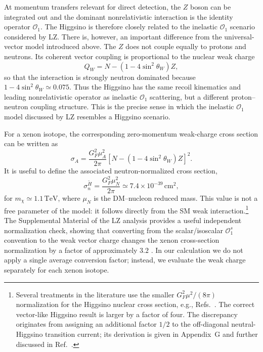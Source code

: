 \documentclass[aps,prd,reprint,superscriptaddress,nofootinbib,longbibliography,floatfix]{revtex4-2}
\newcommand{\TeV}{\mathrm{TeV}}
\begin{document}
At momentum transfers relevant for direct detection, the $Z$ boson can be integrated out and the dominant nonrelativistic interaction is the identity operator $\mathcal{O}_1$. The Higgsino is therefore closely related to the inelastic $\mathcal{O}_1$ scenario considered by LZ. There is, however, an important difference from the universal-vector model introduced above. The $Z$ does not couple equally to protons and neutrons. Its coherent vector coupling is proportional to the nuclear weak charge
\begin{equation}
Q_W=N-(1-4\sin^2\theta_W)Z,
\end{equation}
so that the interaction is strongly neutron dominated because $1-4\sin^2\theta_W\simeq0.075$. Thus the Higgsino has the same recoil kinematics and leading nonrelativistic operator as inelastic $\mathcal{O}_1$ scattering, but a different proton--neutron coupling structure. This is the precise sense in which the inelastic $\mathcal{O}_1$ model discussed by LZ resembles a Higgsino scenario.

For a xenon isotope, the corresponding zero-momentum weak-charge cross section can be written as
\begin{equation}
\sigma_A=
\frac{G_F^2\mu_A^2}{2\pi}
\left[
N-(1-4\sin^2\theta_W)Z
\right]^2.
\end{equation}
It is useful to define the associated neutron-normalized cross section,
\begin{equation}
\sigma_n^{\widetilde H}
=
\frac{G_F^2\mu_N^2}{2\pi}
\simeq
7.4\times10^{-39}\,\mathrm{cm}^2,
\label{eq:higgsinosigma}
\end{equation}
for $m_\chi\simeq1.1\,\TeV$, where $\mu_N$ is the DM--nucleon reduced mass. This value is not a free parameter of the model: it follows directly from the SM weak interaction.\footnote{Several treatments in the literature use the smaller $G_F^2\mu^2/(8\pi)$ normalization for the Higgsino nuclear cross section, e.g., Refs.~\cite{Graham2025,KrallReece2018,NagataShirai2015}. The correct vector-like Higgsino result is larger by a factor of four. The discrepancy originates from assigning an additional factor $1/2$ to the off-diagonal neutral-Higgsino transition current; its derivation is given in Appendix~G and further discussed in Ref.~\cite{PospelovRamani2026}.} The Supplemental Material of the LZ analysis provides a useful independent normalization check, showing that converting from the scalar/isoscalar $\mathcal{O}_1^s$ convention to the weak vector charge changes the xenon cross-section normalization by a factor of approximately $3.2$ \cite{LZ2026Extended}. In our calculation we do not apply a single average conversion factor; instead, we evaluate the weak charge separately for each xenon isotope.
\end{document}
